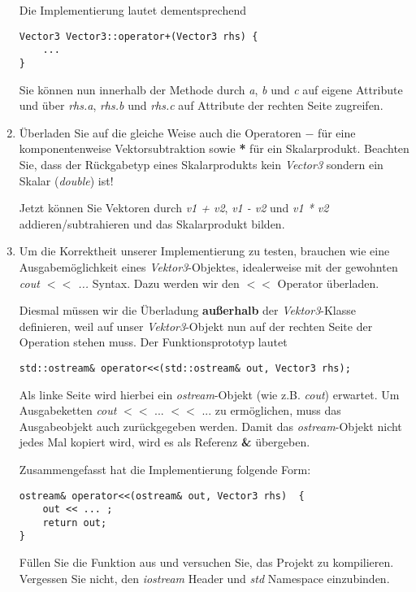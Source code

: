 \documentclass[
  accentcolor=tud1c,	%
  colorbacktitle,		%
  inverttitle,			%
  german,				%
  twoside
]{tudexercise}
\begin{document}
\begin{enumerate}
Die Implementierung lautet dementsprechend
\begin{lstlisting}
Vector3 Vector3::operator+(Vector3 rhs) {
	...
}
\end{lstlisting}

Sie können nun innerhalb der Methode durch \emph{a}, \emph{b} und \emph{c} auf eigene Attribute und über  \emph{rhs.a}, \emph{rhs.b} und \emph{rhs.c} auf Attribute der rechten Seite zugreifen.

\item
Überladen Sie auf die gleiche Weise auch die Operatoren $-$ für eine komponentenweise Vektorsubtraktion sowie \textbf{*} für ein Skalarprodukt. Beachten Sie, dass der Rückgabetyp eines Skalarprodukts kein \emph{Vector3} sondern ein Skalar (\emph{double}) ist!

Jetzt können Sie Vektoren durch \emph{v1 + v2}, \emph{v1 - v2} und \emph{v1 * v2} addieren/subtrahieren und das Skalarprodukt bilden.

\item
Um die Korrektheit unserer Implementierung zu testen, brauchen wie eine Ausgabemöglichkeit eines \emph{Vektor3}-Objektes, idealerweise mit der gewohnten \emph{cout \textbf{$<<$} ...} Syntax. Dazu werden wir den \textbf{$<<$} Operator überladen.

Diesmal müssen wir die Überladung \textbf{außerhalb} der \emph{Vektor3}-Klasse definieren, weil auf unser \emph{Vektor3}-Objekt nun auf der rechten Seite der Operation stehen muss. Der Funktionsprototyp lautet 
\begin{lstlisting}
std::ostream& operator<<(std::ostream& out, Vector3 rhs);
\end{lstlisting}

Als linke Seite wird hierbei ein \emph{ostream}-Objekt (wie z.B. \emph{cout}) erwartet. Um Ausgabeketten \emph{cout} \textbf{$<<$} ... \textbf{$<<$} ... zu ermöglichen, muss das Ausgabeobjekt auch zurückgegeben werden. Damit das \emph{ostream}-Objekt nicht jedes Mal kopiert wird, wird es als Referenz \textbf{\&} übergeben.

Zusammengefasst hat die Implementierung folgende Form:
\begin{lstlisting}
ostream& operator<<(ostream& out, Vector3 rhs)  {
	out << ... ;
	return out;
}
\end{lstlisting}

Füllen Sie die Funktion aus und versuchen Sie, das Projekt zu kompilieren. Vergessen Sie nicht, den \emph{iostream} Header und \emph{std} Namespace einzubinden.


\end{enumerate}
\end{document}
